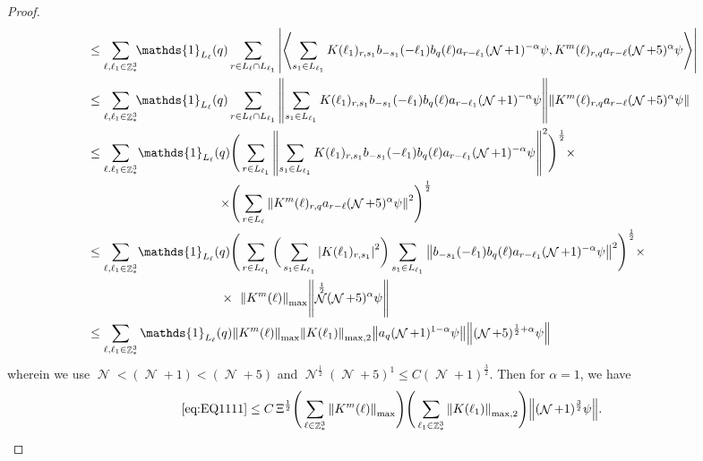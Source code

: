 \documentclass[sn-mathphys, Numbered ,a4paper]{sn-jnl}%
\DeclareMathOperator{\Z}{\mathbb{Z}}
\DeclareMathOperator{\NN}{\mathcal{N}}
\newcommand{\half}{\frac{1}{2}}
\newcommand{\eva}[1]{\left\langle #1 \right\rangle}
\theoremstyle{plain}
\theoremstyle{definition}
\theoremstyle{remark}
\theoremstyle{plain}
\theoremstyle{definition}
\theoremstyle{remark}
\begin{document}
\begin{proof}
\begin{align}
    &\leq \sum\limits_{\ell,\ell_1 \in \Z^3_*} \!\!\mathds{1}_{L_\ell}(q) \sum\limits_{ r \in L_\ell \cap L_{\ell_1}} \abs{\eva{ \sum\limits_{s_1 \in L_{\ell_1}} K(\ell_1)_{r,s_1} b_{-s_1}(-\ell_1) b_{q}(\ell) a_{r-\ell_1} (\NN+1)^{-\alpha} \psi, K^{m}(\ell)_{r,q} a_{r-\ell} (\NN+5)^{\alpha} \psi }}\nonumber\\
    &\leq\sum\limits_{\ell,\ell_1 \in \Z^3_*} \!\!\mathds{1}_{L_\ell}(q) \sum\limits_{ r \in L_\ell \cap L_{\ell_1}}    \norm{\sum\limits_{s_1 \in L_{\ell_1}} K(\ell_1)_{r,s_1} b_{-s_1}(-\ell_1) b_{q}(\ell) a_{r-\ell_1} (\NN+1)^{-\alpha}\psi}\norm{  K^{m}(\ell)_{r,q}  a_{r-\ell} (\NN+5)^{\alpha}\psi } \nonumber\\
    &\leq \sum\limits_{\ell.\ell_1 \in \Z^3_*} \!\!\begin{aligned}[t]\mathds{1}_{L_\ell}(q) \Bigg( &\sum\limits_{r \in L_{\ell_1}} \norm{\sum\limits_{s_1 \in L_{\ell_1}} K(\ell_1)_{r,s_1} b_{-s_1}(-\ell_1) b_{q}(\ell) a_{r-\ell_1} (\NN+1)^{-\alpha}\psi}^2\Bigg)^\half \times\nonumber\\
    \times \Bigg( &\sum\limits_{r \in L_\ell}  \norm{  K^{m}(\ell)_{r,q}  a_{r-\ell} (\NN+5)^{\alpha}\psi }^2\Bigg)^\half \end{aligned}\nonumber\\
    &\leq \sum\limits_{\ell,\ell_1 \in \Z^3_*} \!\!\begin{aligned}[t]\mathds{1}_{L_\ell}(q) \Bigg( &\sum\limits_{r \in L_{\ell_1}} \bigg( \sum\limits_{s_1 \in L_{\ell_1}}\abs{K(\ell_1)_{r,s_1}}^2\bigg) \sum\limits_{s_1 \in L_{\ell_1}} \norm{ b_{-s_1}(-\ell_1) b_{q}(\ell) a_{r-\ell_1} (\NN+1)^{-\alpha}\psi}^2\Bigg)^\half \times\nonumber\\
    \times \;\,\, &\norm{K^{m}(\ell)}_{\mathrm{max}} \norm{ \NN^\half(\NN+5)^{\alpha}\psi }\end{aligned} \nonumber\\
    &\leq \sum\limits_{\ell,\ell_1 \in \Z^3_*}\mathds{1}_{L_\ell}(q) \norm{  K^{m}(\ell)}_{\mathrm{max}}  \norm{K(\ell_1)}_{\mathrm{max,2}}   \norm{   a_{q}(\NN+1)^{1-\alpha}\psi} \norm{  (\NN+5)^{\half+\alpha}\psi } \nonumber\\
\end{align}
wherein we use $\NN<(\NN+1)<(\NN+5)$ and $\NN^\half(\NN+5)^1\leq C(\NN+1)^{\frac{3}{2}}$. Then for $\alpha = 1$, we have
\begin{equation}
    \eqref{eq:EQ1111}\leq C\, \Xi^\half \Bigg(\sum\limits_{\ell \in \Z^3_*} \norm{K^m(\ell)}_{\mathrm{max}}\Bigg)\Bigg( \sum\limits_{\ell_1 \in \Z^3_*}\norm{K(\ell_1)}_{\mathrm{max,2}} \Bigg)  \norm { (\NN+1)^{\frac{3}{2}} \psi }.    

\end{equation}
\end{proof}
\end{document}

